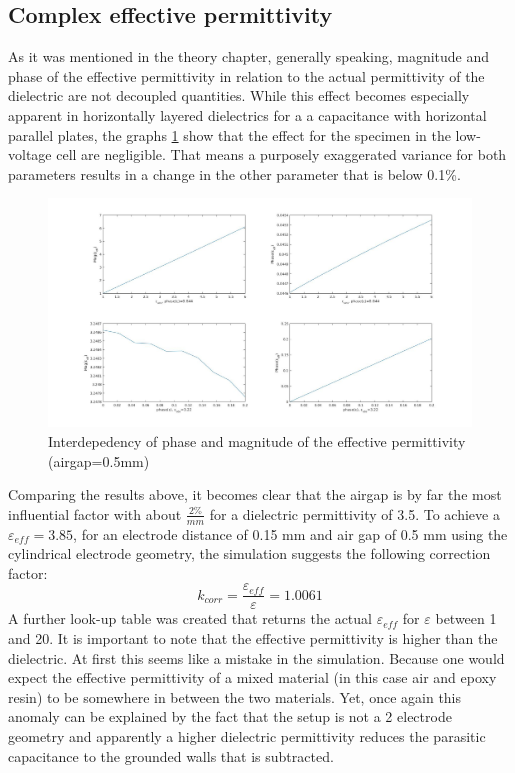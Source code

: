 \subsection{Complex effective permittivity}
As it was mentioned in the theory chapter, generally speaking, magnitude and phase of the effective permittivity in relation to the
actual permittivity of the dielectric are not decoupled quantities. While this effect becomes especially apparent in horizontally layered dielectrics for a
a capacitance with horizontal parallel plates, the graphs \ref{fig.complex} show that the effect for the specimen in the low-voltage cell are negligible. That means a purposely exaggerated variance for both parameters
results in a change in the other parameter that is below 0.1\%.

\begin{figure}[htbp]
	\centering
	\centerline{\includegraphics[width=\textwidth]{figures/Results/Complex/complex_permittivity_specimen}}		
	\caption[Kurze Abbildungsbeschreibung]{Interdepedency of phase and magnitude of the effective permittivity (airgap=0.5mm) } 
	\label{fig.complex}
\end{figure}


Comparing the results above, it becomes clear that the airgap is by
far the most influential factor with about $\frac{2\%}{mm}$ for a dielectric permittivity of 3.5.
To achieve a $\varepsilon_{eff}=3.85$, for an electrode distance of 0.15 mm and air gap of 0.5 mm using the
cylindrical electrode geometry, the simulation
suggests the following correction factor:
\begin{equation}
 k_{corr}=\frac{\varepsilon_{eff}}{\varepsilon}=1.0061
\end{equation}
A further look-up table was created that returns the actual $\varepsilon_{eff}$ for $\varepsilon$ between 1 and 20.
It is important to note that the effective permittivity is higher than the dielectric. At first this seems
like a mistake in the simulation. Because one would expect the effective permittivity of a 
mixed material (in this case air and epoxy resin) to be somewhere in between the two materials.
Yet, once again this anomaly can be explained by
the fact that the setup is not a 2 electrode geometry and apparently a higher dielectric permittivity
reduces the parasitic capacitance to the grounded walls that is subtracted.



